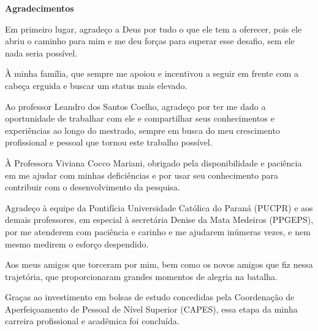 \begin{center}
    \textbf{Agradecimentos}
\end{center}

Em primeiro lugar, agradeço a Deus por tudo o que ele tem a oferecer, pois ele abriu o caminho para mim e me deu forças para superar esse desafio, sem ele nada seria possível.

À minha família, que sempre me apoiou e incentivou a seguir em frente com a cabeça erguida e buscar um status mais elevado.

Ao professor Leandro dos Santos Coelho, agradeço por ter me dado a oportunidade de trabalhar com ele e compartilhar seus conhecimentos e experiências ao longo do mestrado, sempre em busca do meu crescimento profissional e pessoal que tornou este trabalho possível.

À Professora Viviana Cocco Mariani, obrigado pela disponibilidade e paciência em me ajudar com minhas deficiências e por usar seu conhecimento para contribuir com o desenvolvimento da pesquisa.

Agradeço à equipe da Pontifícia Universidade Católica do Paraná (PUCPR) e aos demais professores, em especial à secretária Denise da Mata Medeiros (PPGEPS), por me atenderem com paciência e carinho e me ajudarem inúmeras vezes, e nem mesmo medirem o esforço despendido.

Aos meus amigos que torceram por mim, bem como os novos amigos que fiz nessa trajetória, que proporcionaram grandes momentos de alegria na batalha.

Graças ao investimento em bolsas de estudo concedidas pela Coordenação de Aperfeiçoamento de Pessoal de Nível Superior (CAPES), essa etapa da minha carreira profissional e acadêmica foi concluída.

